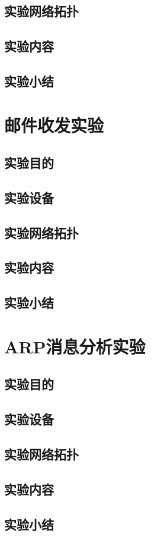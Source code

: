 \documentclass[lang=cn,11pt,a4paper,cite=authoryear]{elegantpaper}
\begin{document}
\subsection{实验网络拓扑}
\subsection{实验内容}
\subsection{实验小结}
\section{邮件收发实验}
\subsection{实验目的}
\subsection{实验设备}
\subsection{实验网络拓扑}
\subsection{实验内容}
\subsection{实验小结}
\section{ARP消息分析实验}
\subsection{实验目的}
\subsection{实验设备}
\subsection{实验网络拓扑}
\subsection{实验内容}
\subsection{实验小结}
\end{document}
